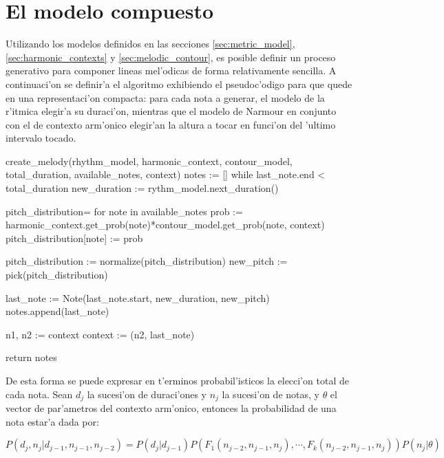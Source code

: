 \section{El modelo compuesto}
Utilizando los modelos definidos en las secciones \ref{sec:metric_model}, \ref{sec:harmonic_contexts} y \ref{sec:melodic_contour}, es posible definir
un proceso generativo para componer lineas mel'odicas de forma relativamente sencilla. 
A continuaci'on se definir'a el algoritmo exhibiendo el pseudoc'odigo para que quede en una representaci'on compacta: 
para cada nota a generar, el modelo de la r'itmica elegir'a su duraci'on, mientras que el modelo de Narmour en conjunto con el de contexto arm'onico 
elegir'an la altura a tocar en funci'on del 'ultimo intervalo tocado.

\begin{algoritmo}
create_melody(rhythm_model, harmonic_context, contour_model, 
              total_duration, available_notes, context)
    notes := []
    while last_note.end < total_duration
        new_duration := rythm_model.next_duration()

        pitch_distribution= {}
        for note in available_notes
            prob := harmonic_context.get_prob(note)*contour_model.get_prob(note, context)
            pitch_distribution[note] := prob 

        pitch_distribution := normalize(pitch_distribution)
        new_pitch := pick(pitch_distribution)

        last_note := Note(last_note.start, new_duration, new_pitch)
        notes.append(last_note) 

        n1, n2 := context
        context := (n2, last_note)

    return notes
\end{algoritmo}

De esta forma se puede expresar en t'erminos probabil'isticos la elecci'on total de cada nota. Sean $d_j$ la sucesi'on de duraci'ones y $n_j$ 
la sucesi'on de notas, y $\theta$ el vector de par'ametros del contexto arm'onico, entonces la probabilidad de una nota estar'a dada por:

$$P(d_j, n_j | d_{j-1}, n_{j-1}, n_{j-2}) = P(d_j|d_{j-1})P(F_1(n_{j-2}, n_{j-1}, n_j), \cdots, F_k(n_{j-2}, n_{j-1}, n_j)) P(n_j | \theta)$$

